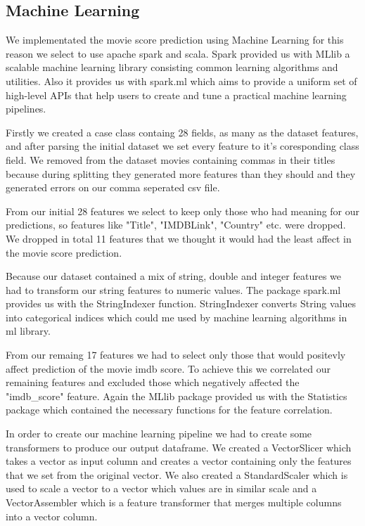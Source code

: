 \documentclass[letterpaper,twocolumn,10pt]{article}
\begin{document}
\subsection{Machine Learning}
We implementated the movie score prediction using Machine Learning for this reason we select to use apache spark and scala. Spark provided us with MLlib a scalable machine learning library consisting common learning algorithms and utilities. Also it provides us with spark.ml which aims to provide a uniform set of high-level APIs that help users to create and tune a practical machine learning pipelines. \par 

Firstly we created a case class containg 28 fields, as many as the dataset features, and after parsing the initial dataset we set every feature to it's coresponding class field. We removed from the dataset movies containing commas in their titles because during splitting they generated more features than they should and they generated errors on our comma seperated csv file.\par 

From our initial 28 features we select to keep only those who had meaning for our predictions, so features like "Title", "IMDBLink", "Country" etc. were dropped. We dropped in total 11 features that we thought it would had the least affect in the movie score prediction. \par 

Because our dataset contained a mix of string, double and integer features we had to transform our string features to numeric values. The package spark.ml provides us with the StringIndexer function. StringIndexer converts String values into categorical indices which could me used by machine learning algorithms in ml library.\par 

From our remaing 17 features we had to select only those that would positevly affect prediction of the movie imdb score. To achieve this we correlated our remaining features and excluded those which negatively affected the "imdb\_score" feature. Again the MLlib package provided us with the Statistics package which contained the necessary functions for the feature correlation.\par 

In order to create our machine learning pipeline we had to create some transformers to produce our output dataframe. We created a VectorSlicer which takes a vector as input column and creates a vector containing only the features that we set from the original vector. We also created a StandardScaler which is used to scale a vector to a vector which values are in similar scale and a VectorAssembler which is a feature transformer that merges multiple columns into a vector column.\par 
\end{document}
